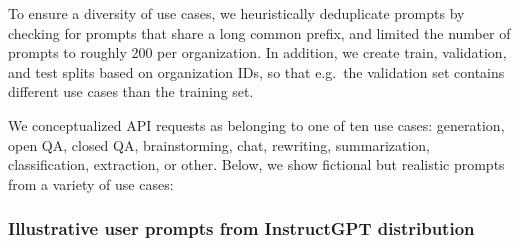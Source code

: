 \documentclass{article}
\begin{document}
To ensure a diversity of use cases, we heuristically deduplicate prompts by checking for prompts that share a long common prefix, and limited the number of prompts to roughly 200 per organization. In addition, we create train, validation, and test splits based on organization IDs, so that e.g.\ the validation set contains different use cases than the training set.

We conceptualized API requests as belonging to one of ten use cases: generation, open QA, closed QA, brainstorming, chat, rewriting, summarization, classification, extraction, or other. Below, we show fictional but realistic prompts from a variety of use cases:

\subsubsection{Illustrative user prompts from InstructGPT distribution}
\label{apdx:instructgpt-prompts}
\end{document}

